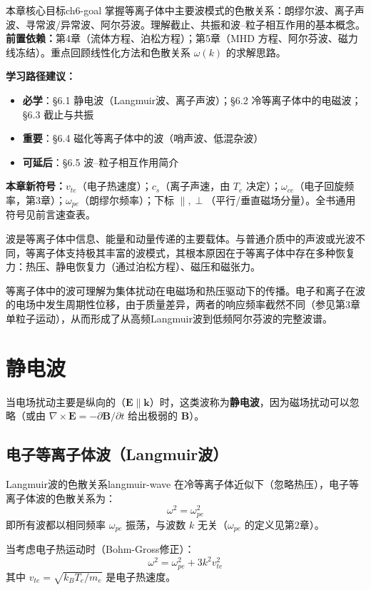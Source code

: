 \documentclass[12pt,a4paper,openany,oneside]{book}
\newcommand{\vect}[1]{\bm{#1}}
\newcommand{\curl}{\nabla\times}
\newcommand{\difficulty}[1]{\marginnote{\hfill\textcolor{coverMid!80}{\rule[-0.1em]{2pt}{0.9em}}\,\textcolor{coverMid}{\footnotesize\textbf{[#1]}}}}
\begin{document}
\begin{insight}{本章核心目标}{ch6-goal}
掌握等离子体中主要波模式的色散关系：朗缪尔波、离子声波、寻常波/异常波、阿尔芬波。理解截止、共振和波--粒子相互作用的基本概念。
\tcblower
\textbf{前置依赖：}第4章（流体方程、泊松方程）；第5章（MHD 方程、阿尔芬波、磁力线冻结）。重点回顾线性化方法和色散关系 $\omega(k)$ 的求解思路。

\textbf{学习路径建议：}

\begin{itemize}[leftmargin=*]
\item[\textcolor{red}{$\blacksquare$}] \textbf{必学}：\S6.1 静电波（Langmuir波、离子声波）；\S6.2 冷等离子体中的电磁波；\S6.3 截止与共振
\item[\textcolor{orange}{$\blacksquare$}] \textbf{重要}：\S6.4 磁化等离子体中的波（哨声波、低混杂波）
\item[\textcolor{green}{$\blacksquare$}] \textbf{可延后}：\S6.5 波--粒子相互作用简介
\end{itemize}

\textbf{本章新符号：}$v_{te}$（电子热速度）；$c_s$（离子声速，由 $T_e$ 决定）；$\omega_{ce}$（电子回旋频率，第3章）；$\omega_{pe}$（朗缪尔频率）；下标 $\parallel,\perp$（平行/垂直磁场分量）。全书通用符号见前言速查表。
\end{insight}

波是等离子体中信息、能量和动量传递的主要载体。与普通介质中的声波或光波不同，等离子体支持极其丰富的波模式，其根本原因在于等离子体中存在多种恢复力：热压、静电恢复力（通过泊松方程）、磁压和磁张力。

等离子体中的波可理解为集体扰动在电磁场和热压驱动下的传播。电子和离子在波的电场中发生周期性位移，由于质量差异，两者的响应频率截然不同（参见第3章单粒子运动），从而形成了从高频Langmuir波到低频阿尔芬波的完整波谱。

\section{静电波}\difficulty{基础}

当电场扰动主要是纵向的（$\vect{E}\parallel\vect{k}$）时，这类波称为\textbf{静电波}，因为磁场扰动可以忽略（或由 $\curl\vect{E} = -\partial\vect{B}/\partial t$ 给出极弱的 $\vect{B}$）。

\subsection{电子等离子体波（Langmuir波）}

\begin{theorem}{Langmuir波的色散关系}{langmuir-wave}
在冷等离子体近似下（忽略热压），电子等离子体波的色散关系为：
\[
\omega^2 = \omega_{pe}^2
\label{eq:plasma-frequency}
\]
即所有波都以相同频率 $\omega_{pe}$ 振荡，与波数 $k$ 无关（$\omega_{pe}$ 的定义见第2章）。

当考虑电子热运动时（Bohm-Gross修正）：
\[
\omega^2 = \omega_{pe}^2 + 3k^2 v_{te}^2
\]
其中 $v_{te} = \sqrt{k_B T_e/m_e}$ 是电子热速度。
\end{theorem}
\end{document}
